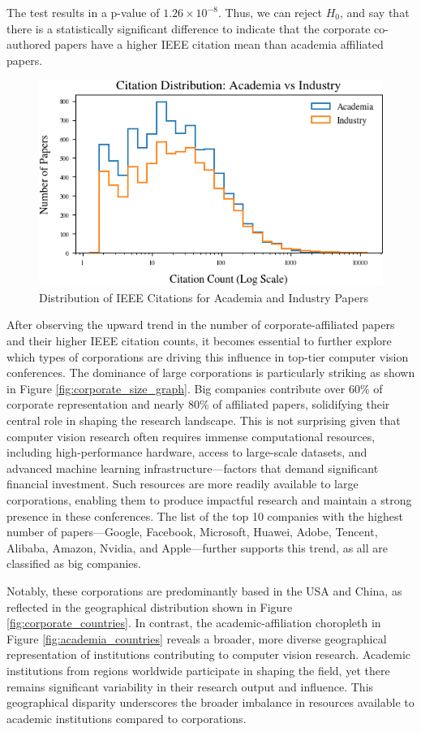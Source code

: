 \documentclass{article}
\begin{document}
The test results in a p-value of $1.26 \times 10^{-8}$. Thus, we can reject $H_0$, and say that there is a statistically significant difference to indicate that the corporate co-authored papers have a higher IEEE citation mean than academia affiliated papers.   

\begin{figure}
    \centering
    \includegraphics[width=0.6\linewidth]{images/histogram_ieee_citations.png}
    \caption{Distribution of IEEE Citations for Academia and Industry Papers}
    \label{fig:ieee_citations}
\end{figure}

After observing the upward trend in the number of corporate-affiliated papers and their higher IEEE citation counts, it becomes essential to further explore which types of corporations are driving this influence in top-tier computer vision conferences. The dominance of large corporations is particularly striking as shown in Figure \ref{fig:corporate_size_graph}. Big companies contribute over 60\% of corporate representation and nearly 80\% of affiliated papers, solidifying their central role in shaping the research landscape. This is not surprising given that computer vision research often requires immense computational resources, including high-performance hardware, access to large-scale datasets, and advanced machine learning infrastructure—factors that demand significant financial investment. Such resources are more readily available to large corporations, enabling them to produce impactful research and maintain a strong presence in these conferences. The list of the top 10 companies with the highest number of papers—Google, Facebook, Microsoft, Huawei, Adobe, Tencent, Alibaba, Amazon, Nvidia, and Apple—further supports this trend, as all are classified as big companies. 

Notably, these corporations are predominantly based in the USA and China, as reflected in the geographical distribution shown in Figure \ref{fig:corporate_countries}. In contrast, the academic-affiliation choropleth in Figure \ref{fig:academia_countries} reveals a broader, more diverse geographical representation of institutions contributing to computer vision research. Academic institutions from regions worldwide participate in shaping the field, yet there remains significant variability in their research output and influence. This geographical disparity underscores the broader imbalance in resources available to academic institutions compared to corporations.
\end{document}
